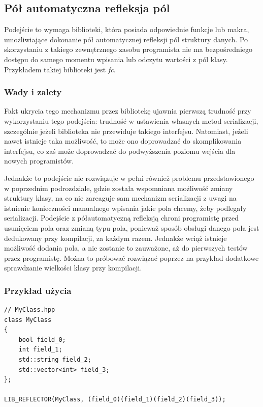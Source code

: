 \documentclass[12pt]{article}
\newcommand{\n}{\newline}
\newcommand{\nonpl}[1]{{\it #1}}
\begin{document}
{		{
			\subsection{Pół automatyczna refleksja pól}

			Podejście to wymaga biblioteki, która posiada odpowiednie funkcje lub makra, umożliwiające dokonanie pół automatycznej
			refleksji pól struktury danych. Po skorzystaniu z takiego zewnętrznego zasobu programista nie ma bezpośredniego dostępu do samego momentu
			wpisania lub odczytu wartości z pól klasy. Przykładem takiej biblioteki jest \nonpl{fc}\cite{fc_repo}.\n

			{
				\subsubsection{Wady i zalety}

				Fakt ukrycia tego mechanizmu przez bibliotekę ujawnia pierwszą trudność przy wykorzystaniu tego podejścia: trudność w ustawienia własnych
				metod serializacji, szczególnie jeżeli biblioteka nie przewiduje takiego interfejsu. Natomiast, jeżeli nawet istnieje taka możliwość,
				to może ono doprowadzać do skomplikowania interfejsu, co zaś może doprowadzać do podwyższenia poziomu wejścia dla nowych programistów.

				Jednakże to podejście nie rozwiązuje w pełni również problemu przedstawionego w poprzednim podrozdziale, gdzie została wspomniana
				możliwość zmiany struktury klasy, na co nie zareaguje sam mechanizm serializacji z uwagi na istnienie
				konieczności manualnego wpisania jakie pola chcemy, żeby podlegały serializacji. Podejście z półautomatyczną refleksją
				chroni programistę przed usunięciem pola oraz zmianą typu pola, ponieważ sposób obsługi danego pola jest dedukowany przy
				kompilacji, za każdym razem. Jednakże wciąż istnieje możliwość dodania pola, a nie zostanie to zauważone, aż do pierwszych testów
				przez programistę. Można to próbować rozwiązać poprzez na przykład dodatkowe sprawdzanie wielkości klasy przy kompilacji.
			}

			{
				\subsubsection{Przykład użycia}
				\begin{lstlisting}[frame=single]
// MyClass.hpp
class MyClass
{
	bool field_0;
	int field_1;
	std::string field_2;
	std::vector<int> field_3;
};

LIB_REFLECTOR(MyClass, (field_0)(field_1)(field_2)(field_3));


\end{lstlisting}}}}
\end{document}
